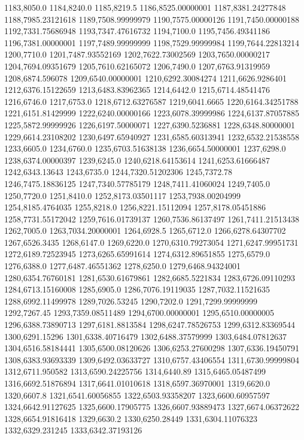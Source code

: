 1183,8050.0
1184,8240.0
1185,8219.5
1186,8525.00000001
1187,8381.24277848
1188,7985.23121618
1189,7508.99999979
1190,7575.00000126
1191,7450.00000188
1192,7331.75686948
1193,7347.47616732
1194,7100.0
1195,7456.49341186
1196,7381.00000001
1197,7489.99999999
1198,7529.99999984
1199,7644.22813214
1200,7710.0
1201,7487.93552169
1202,7622.73002569
1203,7650.00000217
1204,7694.09351679
1205,7610.62165072
1206,7490.0
1207,6763.91319959
1208,6874.596078
1209,6540.00000001
1210,6292.30084274
1211,6626.9286401
1212,6376.15122659
1213,6483.83962365
1214,6442.0
1215,6714.48541476
1216,6746.0
1217,6753.0
1218,6712.63276587
1219,6041.6665
1220,6164.34251788
1221,6151.81429999
1222,6240.00000166
1223,6078.39999986
1224,6137.87057885
1225,5872.99999926
1226,6197.50000071
1227,6390.5236881
1228,6348.80000001
1229,6614.23108202
1230,6497.65940927
1231,6585.60313941
1232,6532.21538558
1233,6605.0
1234,6760.0
1235,6703.51638138
1236,6654.50000001
1237,6298.0
1238,6374.00000397
1239,6245.0
1240,6218.64153614
1241,6253.61666487
1242,6343.13643
1243,6735.0
1244,7320.51202306
1245,7372.78
1246,7475.18836125
1247,7340.57785179
1248,7411.41060024
1249,7405.0
1250,7720.0
1251,8410.0
1252,8173.03501117
1253,7938.00204999
1254,8185.4764035
1255,8218.0
1256,8221.15112094
1257,8178.05451886
1258,7731.55172042
1259,7616.01739137
1260,7536.86137497
1261,7411.21513438
1262,7005.0
1263,7034.20000001
1264,6928.5
1265,6712.0
1266,6278.64307702
1267,6526.3435
1268,6147.0
1269,6220.0
1270,6310.79273054
1271,6247.99951731
1272,6189.72523945
1273,6265.65991614
1274,6312.89651855
1275,6579.0
1276,6388.0
1277,6487.46551362
1278,6250.0
1279,6468.94324001
1280,6354.76760181
1281,6530.61679861
1282,6685.5221834
1283,6726.09110293
1284,6713.15160008
1285,6905.0
1286,7076.19119035
1287,7032.11521635
1288,6992.11499978
1289,7026.53245
1290,7202.0
1291,7299.99999999
1292,7267.45
1293,7359.08511489
1294,6700.00000001
1295,6510.00000005
1296,6388.73890713
1297,6181.8813584
1298,6247.78526753
1299,6312.83369544
1300,6291.15296
1301,6338.40716479
1302,6488.37579999
1303,6484.07812637
1304,6516.58184441
1305,6500.08120626
1306,6253.27600298
1307,6336.19450791
1308,6383.93693339
1309,6492.03633727
1310,6757.43406554
1311,6730.99999804
1312,6711.950582
1313,6590.24225756
1314,6440.89
1315,6465.05487499
1316,6692.51876894
1317,6641.01010618
1318,6597.36970001
1319,6620.0
1320,6607.8
1321,6541.60056855
1322,6503.93358207
1323,6600.60957597
1324,6642.91127625
1325,6600.17905775
1326,6607.93889473
1327,6674.06372622
1328,6654.91816418
1329,6630.2
1330,6250.28449
1331,6304.11076323
1332,6329.231245
1333,6342.37193126
